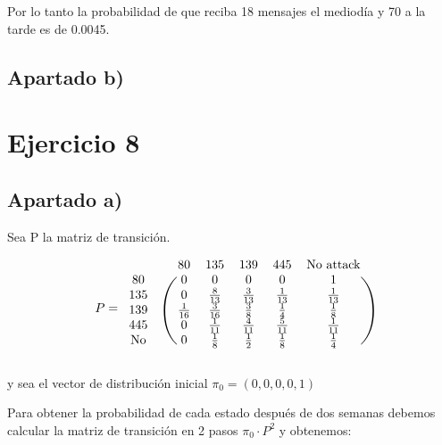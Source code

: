\documentclass[11pt]{article}
\begin{document}
Por lo tanto la probabilidad de que reciba 18 mensajes el mediodía y 70 a la tarde es de 0.0045.


\subsection*{Apartado b)}


\section{Ejercicio 8}

\subsection*{Apartado a)}

Sea P la matriz de transición.

\begin{equation*}
  P = 
  \begin{blockarray}{ccccccc}
    & & 80 & 135 & 139 & 445 & \text{No attack} \\
    \begin{block}{cc(ccccc)}
      80        & & 0            & 0            & 0            & 0            & 1 \\
      135       & & 0            & \frac{8}{13} & \frac{3}{13} & \frac{1}{13} & \frac{1}{13} \\
      139       & & \frac{1}{16} & \frac{3}{16} & \frac{3}{8}  & \frac{1}{4}  & \frac{1}{8} \\
      445       & & 0            & \frac{1}{11} & \frac{4}{11} & \frac{5}{11} & \frac{1}{11} \\
      \text{No} & & 0            & \frac{1}{8}  & \frac{1}{2}  & \frac{1}{8}  & \frac{1}{4} \\
    \end{block}
  \end{blockarray}
\end{equation*}

y sea el vector de distribución inicial $\pi_0 = (0, 0, 0, 0, 1)$

Para obtener la probabilidad de cada estado después de dos semanas debemos calcular
la matriz de transición en 2 pasos $\pi_0 \cdot P^2$ y obtenemos:
\end{document}
